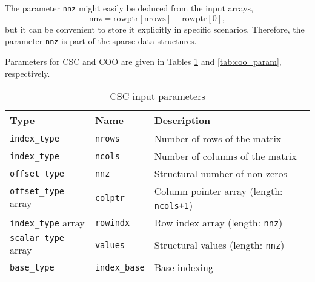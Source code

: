 \documentclass{article}
\begin{document}
The parameter \texttt{nnz} might easily be deduced from the input arrays,
\[\textrm{nnz} = \textrm{rowptr}[\textrm{nrows}] - \textrm{rowptr}[0],\] 
but it can be convenient to store it explicitly in specific scenarios. Therefore, the parameter \texttt{nnz} is part of the sparse data structures.

Parameters for CSC and COO are given in Tables \ref{tab:csc_param} and \ref{tab:coo_param}, respectively.






\begin{table}[htbp]
\scriptsize
\begin{center}
     \begin{tabular}{l l l}
         \toprule
         \textbf{Type}      & \textbf{Name} & \textbf{Description} \\
         \midrule
         \texttt{index\_type} & \texttt{nrows} & Number of rows of the matrix \\
         \texttt{index\_type} & \texttt{ncols} & Number of columns of the matrix \\
         \texttt{offset\_type} & \texttt{nnz} & Structural number of non-zeros \\
         \texttt{offset\_type} array & \texttt{colptr} & Column pointer array (length: \texttt{ncols+1}) \\
         \texttt{index\_type} array & \texttt{rowindx} & Row index array (length: \texttt{nnz}) \\
         \texttt{scalar\_type} array & \texttt{values} & Structural values (length: \texttt{nnz}) \\
         \texttt{base\_type} & \texttt{index\_base} & Base indexing \\
         \bottomrule
     \end{tabular}
\end{center}
     \caption{CSC input parameters}
    \label{tab:csc_param}
\end{table}
\end{document}
